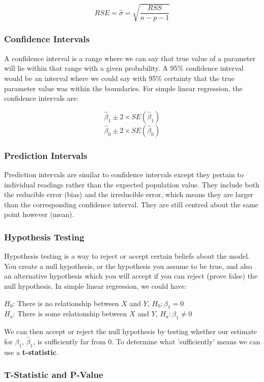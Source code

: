 $$ RSE = \hat{\sigma} = \sqrt{\frac{RSS}{n-p-1}} $$

\subsubsection{Confidence Intervals}

A confidence interval is a range where we can say that true value of a parameter will lie within that range with a given probability. A 95\% confidence interval would be an interval where we could say with 95\% certainty that the true parameter value was within the boundaries. For simple linear regression, the confidence intervals are:

$$ \hat{\beta}_{1} \pm 2\times SE(\hat{\beta}_{1}) $$
$$ \hat{\beta}_{0} \pm 2\times SE(\hat{\beta}_{0}) $$

\subsubsection{Prediction Intervals}

Prediction intervals are similar to confidence intervals except they pertain to individual readings rather than the expected population value. They include both the reducible error (bias) and the irreducible error, which means they are larger than the corresponding confidence interval. They are still centred about the same point however (mean).

\subsubsection{Hypothesis Testing}

Hypothesis testing is a way to reject or accept certain beliefs about the model. You create a null hypothesis, or the hypothesis you assume to be true, and also an alternative hypothesis which you will accept if you can reject (prove false) the null hypothesis. In simple linear regression, we could have:

$H_{0}$: There is no relationship between $X$ and $Y$, $H_{0}: \beta_{1} = 0$\\
$H_{a}$: There is some relationship between $X$ and $Y$, $H_{a}: \beta_{1} \neq 0$

We can then accept or reject the null hypothesis by testing whether our estimate for $\beta_{1}$, $\hat{\beta}_{1}$, is sufficiently far from 0. To determine what 'sufficiently' means we can use a \textbf{t-statistic}.

\subsubsection{T-Statistic and P-Value}


